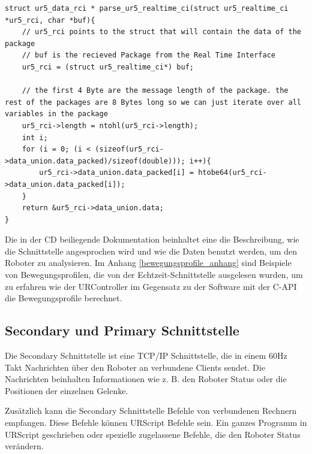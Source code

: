 \begin{lstlisting}[caption={Umwandlung der Byte-Order für Packet über die Echtzeit-Schnittstellen }, label=lst:rci_parse ,captionpos=b]
struct ur5_data_rci * parse_ur5_realtime_ci(struct ur5_realtime_ci *ur5_rci, char *buf){
    // ur5_rci points to the struct that will contain the data of the package
    // buf is the recieved Package from the Real Time Interface
    ur5_rci = (struct ur5_realtime_ci*) buf;

    // the first 4 Byte are the message length of the package. the rest of the packages are 8 Bytes long so we can just iterate over all variables in the package 
    ur5_rci->length = ntohl(ur5_rci->length);
    int i;
    for (i = 0; (i < (sizeof(ur5_rci->data_union.data_packed)/sizeof(double))); i++){
        ur5_rci->data_union.data_packed[i] = htobe64(ur5_rci->data_union.data_packed[i]);
    }
    return &ur5_rci->data_union.data;
}
\end{lstlisting}

Die in der CD beiliegende Dokumentation beinhaltet eine die Beschreibung, wie die Schnittstelle angesprochen wird und wie die Daten benutzt werden, um den Roboter zu analysieren. Im Anhang \ref{bewegungsprofile_anhang} sind Beispiele von Bewegungsprofilen, die von der Echtzeit-Schnittstelle ausgelesen wurden, um zu erfahren wie der URController im Gegensatz zu der Software mit der C-API die Bewegungsprofile berechnet.

\subsection{Secondary und Primary Schnittstelle}
\label{urcontrol_spi_gru}

Die Secondary Schnittstelle ist eine \acs{TCP/IP} Schnittstelle, die in einem 60Hz Takt Nachrichten über den Roboter an verbundene Clients sendet.
Die Nachrichten beinhalten Informationen wie z. B. den Roboter Status oder die Positionen der einzelnen Gelenke.

Zusätzlich kann die Secondary Schnittstelle Befehle von verbundenen Rechnern empfangen.
Diese Befehle können URScript Befehle sein. Ein ganzes Programm in URScript geschrieben oder spezielle zugelassene Befehle, die den Roboter Status verändern.

